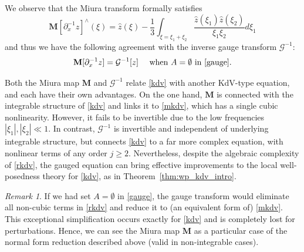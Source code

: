 \documentclass[a4paper,
11pt,  reqno]{amsart}
\newcommand{\5}{\textup{V}}
\newcommand{\noi}{\noindent}
\newcommand{\dx}{\partial_x}
\theoremstyle{remark}
\newtheorem{remark}[theorem]{Remark}
\newcommand{\MMb}{\mathbf{M}}
\newcommand{\Gc}{\mathcal{G}}
\numberwithin{equation}{section}
\numberwithin{theorem}{section}
\begin{document}
		We observe that the Miura transform formally satisfies
		\begin{equation}\label{eq:miura2}
			{\MMb[\partial_x^{-1}z]}^\wedge(\xi) = \widehat{z}(\xi)-\frac{1}{3}\int_{\xi=\xi_1+\xi_2} \frac{\widehat{z}(\xi_1)\widehat{z}(\xi_2)}{\xi_1\xi_2}d\xi_1
		\end{equation}
        and thus we have the following agreement with the inverse gauge transform $\Gc^{-1}$:
        \begin{equation}
\MMb[\dx^{-1} z]=\Gc^{-1}[z]\quad \mbox{ when }A=\emptyset\mbox{ in }\eqref{gauge}.
        \end{equation}

{
\noi
Both the Miura map $\MMb$ and $\Gc^{-1}$ relate \eqref{kdv} with another KdV-type equation, and each have their own advantages.
On the one hand, $\MMb$ is connected with the integrable structure of \eqref{kdv} and links it to \eqref{mkdv}, which has a single cubic nonlinearity. However, it fails to be invertible due to the low frequencies $|\xi_1|, |\xi_2|\ll 1$.
In contrast, $\Gc^{-1}$ is invertible and independent of underlying integrable structure, but connects \eqref{kdv} to a far more complex equation, with nonlinear terms of any order $j\ge2$. Nevertheless, despite  the algebraic complexity of \eqref{rkdv}, the gauged equation can bring effective improvements to the local well-posedness theory for \eqref{kdv}, as in Theorem~\ref{thm:wp_kdv_intro}.

}



        \begin{remark}
If we had set $A=\emptyset$ in \eqref{gauge}, the gauge transform would eliminate all non-cubic terms in \eqref{rkdv} and reduce it to (an equivalent form of) \eqref{mkdv}. This exceptional simplification occurs exactly for \eqref{kdv} and is completely lost for perturbations.
Hence, we can see the Miura map $\MMb$ as a particular case of the normal form reduction described above (valid in non-integrable cases).


        \end{remark}
\end{document}
